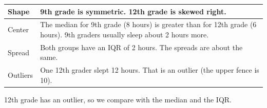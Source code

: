 \documentclass[11pt]{article}
\begin{document}
\begin{center}\end{center}

\renewcommand{\arraystretch}{1.25}
\begin{tabular}{|>{\raggedright\arraybackslash}p{0.9in}|>{\raggedright\arraybackslash}p{5.7in}|}\hline
Shape & 9th grade is symmetric. 12th grade is skewed right.\\ \hline
Center & The median for 9th grade (8 hours) is greater than for 12th grade (6 hours). 9th graders usually sleep about 2 hours more.\\ \hline
Spread & Both groups have an IQR of 2 hours. The spreads are about the same.\\ \hline
Outliers & One 12th grader slept 12 hours. That is an outlier (the upper fence is 10).\\ \hline
\end{tabular}

\vspace{0.4em}
12th grade has an outlier, so we compare with the median and the IQR.

\partner
\end{document}
